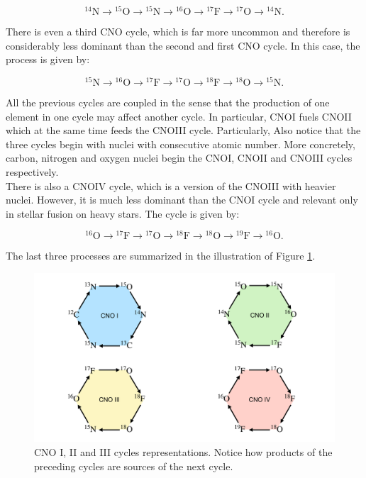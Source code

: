 \documentclass[openany]{book}
\begin{document}
\begin{equation} \label{eq:reaction_CNO_N}
	\mathrm{{}^{14}N  \rightarrow {}^{15}O \rightarrow {}^{15}N \rightarrow {}^{16}O  \rightarrow {}^{17}F  \rightarrow {}^{17}O  \rightarrow {}^{14}N}.
\end{equation}

There is even a third CNO cycle, which is far more uncommon and therefore is considerably less dominant than the second and first CNO cycle. In this case, the process is given by: 

\begin{equation} \label{eq:reaction_CNO_O}
	\mathrm{{}^{15}N  \rightarrow {}^{16}O  \rightarrow {}^{17}F \rightarrow {}^{17}O   \rightarrow {}^{18}F  \rightarrow {}^{18}O  \rightarrow {}^{15}N  }.
\end{equation}

All the previous cycles are coupled in the sense that the production of one element in one cycle may affect another cycle. In particular, CNOI fuels CNOII which at the same time feeds the CNOIII cycle. Particularly, Also notice that the three cycles begin with nuclei with consecutive atomic number. More concretely, carbon, nitrogen and oxygen nuclei begin the CNOI, CNOII and CNOIII cycles respectively.\\

There is also a CNOIV cycle, which is a version of the CNOIII with heavier nuclei. However, it is much less dominant than the CNOI cycle and relevant only in stellar fusion on heavy stars. The cycle is given by:

\begin{equation} \label{eq:reaction_CNO_O_4}
	\mathrm{{}^{16}O  \rightarrow {}^{17}F  \rightarrow {}^{17}O  \rightarrow {}^{18}F \rightarrow {}^{18}O   \rightarrow {}^{19}F  \rightarrow {}^{16}O  }.
\end{equation}


The last three processes are summarized in the illustration of Figure \ref{fig:CNOcyles}.


\begin{figure}[H]
	\centering 
	\includegraphics[scale=0.25]{Graphs/CNOchart.pdf}
	\caption[CNO I, II and III cycles representations]{CNO I, II and III cycles representations. Notice how products of the preceding cycles are sources of the next cycle. }
	\label{fig:CNOcyles}
\end{figure}
\end{document}
